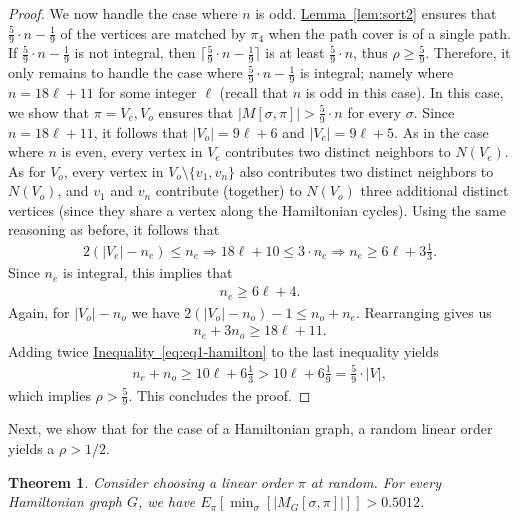 \documentclass[11pt]{article}
\numberwithin{equation}{section}
\newtheorem{theorem}{Theorem}[section]
\theoremstyle{definition}
\theoremstyle{plain}
\newcommand{\expref}[2]{\hyperref[#2]{#1~\ref{#2}}}
\newcommand{\expeqref}[2]{\hyperref[#2]{#1~\eqref{#2}}}
\theoremstyle{plain}
\begin{document}
\begin{proof}
	We now handle the case where $n$ is odd. \expref{Lemma}{lem:sort2} ensures that $\frac{5}{9}\cdot n -\frac{1}{9}$ of the vertices are matched by $\pi_4$ when the path cover is of a single path.
	If $\frac{5}{9}\cdot n -\frac{1}{9}$ is not integral, then $\lceil \frac{5}{9}\cdot n -\frac{1}{9}\rceil$ is at least $\frac{5}{9}\cdot n$, thus $\rho \geq \frac{5}{9}$.
	Therefore, it only remains to handle the case where $\frac{5}{9}\cdot n -\frac{1}{9}$ is integral;
	namely where $n=18\ell+11$ for some integer $\ell$ (recall that $n$ is odd in this case).
	In this case, we show that $\pi=V_e, V_o$ ensures that $|M[\sigma,\pi]|> \frac{5}{9}\cdot n$ for every $\sigma$. Since $n=18\ell+11$,
%
  it follows that $|V_o|=9\ell+6$ and $|V_e|=9\ell+5$. %
%
%
	As in the case where $n$ is even, every vertex in $V_e$ contributes two distinct neighbors to $N(V_e)$.
	As for $V_o$, every vertex in $V_o \setminus \{v_1,v_n\}$ also contributes two distinct neighbors to $N(V_o)$, and $v_1$ and $v_n$ contribute (together) to $N(V_o)$ three additional distinct vertices (since they share a vertex along the Hamiltonian cycles).
	Using the same reasoning as before, it follows that 
	\begin{eqnarray}
		2(|V_e|-n_e)\leq n_e\Rightarrow 18\ell+10\leq 3\cdot n_e\Rightarrow n_e\geq 6\ell+3\frac{1}{3}.
		\end{eqnarray}
	 Since $n_e$ is integral, this implies that
	\begin{eqnarray}
	n_e\geq 6\ell+4.
	\label{eq:eq1-hamilton}
	\end{eqnarray}
	Again, for $|V_o|-n_o$ we have $2(|V_o|-n_o)-1\leq n_o+n_e$. Rearranging gives us 
	\begin{eqnarray}
		n_e+3n_o\geq 18\ell+11.\end{eqnarray}
	Adding twice \expeqref{Inequality}{eq:eq1-hamilton} to the last inequality yields \begin{eqnarray}
		n_e+n_o\geq 10\ell+6\frac{1}{3}>10\ell +6\frac{1}{9}=\frac{5}{9}\cdot |V|,\end{eqnarray} which implies $\rho >\frac{5}{9}$. %
	This concludes the proof.
\end{proof}

Next, we show that for the case of a Hamiltonian graph, a random linear order yields a $\rho>1/2$.

\begin{theorem}
  Consider choosing a linear order $\pi$
%
%
%
%
%
%
%
%
%
%
at random. For every Hamiltonian graph $G$,
%
we have  %
$E_{\pi}[\min_{\sigma}[|M_G[\sigma,\pi]|]] > 0.5012$.
	\label{thm:random-hamiltonian}
\end{theorem}	
\end{document}
